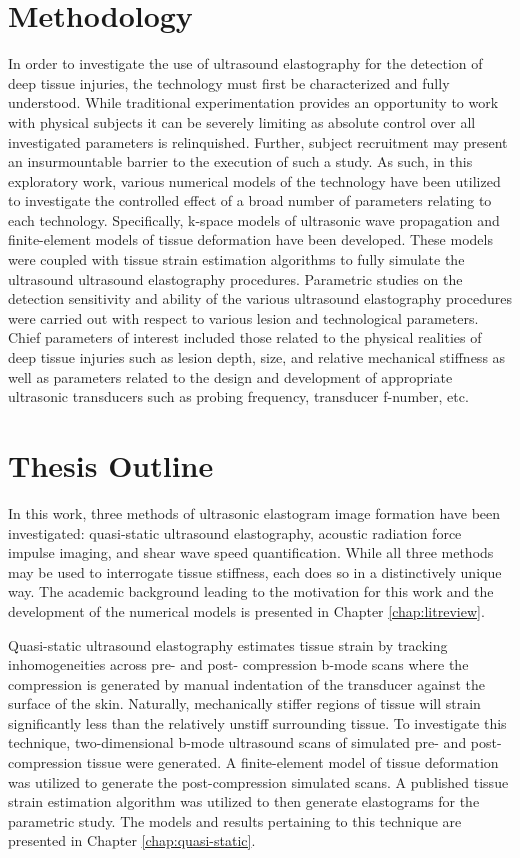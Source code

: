 	\section{Methodology}
		In order to investigate the use of ultrasound elastography for the detection of deep tissue injuries, the technology must first be characterized and fully understood. While traditional experimentation provides an opportunity to work with physical subjects it can be severely limiting as absolute control over all investigated parameters is relinquished. Further, subject recruitment may present an insurmountable barrier to the execution of such a study. As such, in this exploratory work, various numerical models of the technology have been utilized to investigate the controlled effect of a broad number of parameters relating to each technology. Specifically, k-space models of ultrasonic wave propagation and finite-element models of tissue deformation have been developed. These models were coupled with tissue strain estimation algorithms to fully simulate the ultrasound ultrasound elastography procedures. Parametric studies on the detection sensitivity and ability of the various ultrasound elastography procedures were carried out with respect to various lesion and technological parameters. Chief parameters of interest included those related to the physical realities of deep tissue injuries such as lesion depth, size, and relative mechanical stiffness as well as parameters related to the design and development of appropriate ultrasonic transducers such as probing frequency, transducer f-number, etc.

	\section{Thesis Outline}
		In this work, three methods of ultrasonic elastogram image formation have been investigated: quasi-static ultrasound elastography, acoustic radiation force impulse imaging, and shear wave speed quantification. While all three methods may be used to interrogate tissue stiffness, each does so in a distinctively unique way. The academic background leading to the motivation for this work and the development of the numerical models is presented in Chapter \ref{chap:litreview}.

		Quasi-static ultrasound elastography estimates tissue strain by tracking inhomogeneities across pre- and post- compression b-mode scans where the compression is generated by manual indentation of the transducer against the surface of the skin. Naturally, mechanically stiffer regions of tissue will strain significantly less than the relatively unstiff surrounding tissue. To investigate this technique, two-dimensional b-mode ultrasound scans of simulated pre- and post-compression tissue were generated. A finite-element model of tissue deformation was utilized to generate the post-compression simulated scans. A published tissue strain estimation algorithm was utilized to then generate elastograms for the parametric study. The models and results pertaining to this technique are presented in Chapter \ref{chap:quasi-static}.

